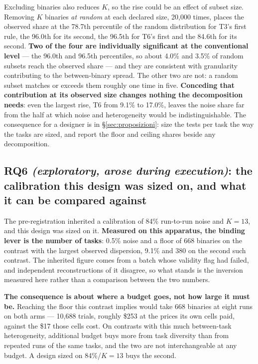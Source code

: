 Excluding binaries also reduces $K$, so the rise could be an effect of subset size. Removing $K$ binaries
\emph{at random} at each declared size, 20{,}000 times, places the observed share at the 78.7th percentile
of the random distribution for T3's first rule, the 96.0th for its second, the 96.5th for T6's first and
the 84.6th for its second. \textbf{Two of the four are individually significant at the conventional
level} --- the 96.0th and 96.5th percentiles, so about 4.0\% and 3.5\% of random subsets reach the observed
share --- and they are consistent with granularity contributing to the between-binary spread. The other two
are not: a random subset matches or exceeds them roughly one time in five. \textbf{Conceding that
contribution at its observed size changes nothing the decomposition needs}: even the largest rise, T6 from
9.1\% to 17.0\%, leaves the noise share far from the half at which noise and heterogeneity would be
indistinguishable. The consequence for a designer is in
\S\ref{sec:proposizioni}: size the tests per task the way the tasks are sized, and report the floor and
ceiling shares beside any decomposition.

\subsection{RQ6 \emph{(exploratory, arose during execution)}: the calibration this design was
sized on, and what it can be compared against}
\label{sec:rq6}

The pre-registration inherited a calibration of 84\% run-to-run noise and $K{=}13$, and this design was
sized on it. \textbf{Measured on this apparatus, the binding lever is the number of tasks}: 0.5\% noise and
a floor of 668 binaries on the contrast with the largest observed dispersion, 9.1\% and 380 on the second
such contrast. The inherited figure comes from a batch whose validity flag had failed, and independent
reconstructions of it disagree, so what stands is the inversion measured here rather than a comparison
between the two numbers.

\textbf{The consequence is about where a budget goes, not how large it must be.} Reaching the floor this
contrast implies would take 668 binaries at eight runs on both arms --- 10{,}688 trials, roughly \$253 at
the prices its own cells paid, against the \$17 those cells cost. On contrasts with this much between-task
heterogeneity, additional budget buys more from task diversity than from repeated runs of the same tasks,
and the two are not interchangeable at any budget. A design sized on 84\%/$K{=}13$ buys the second.

